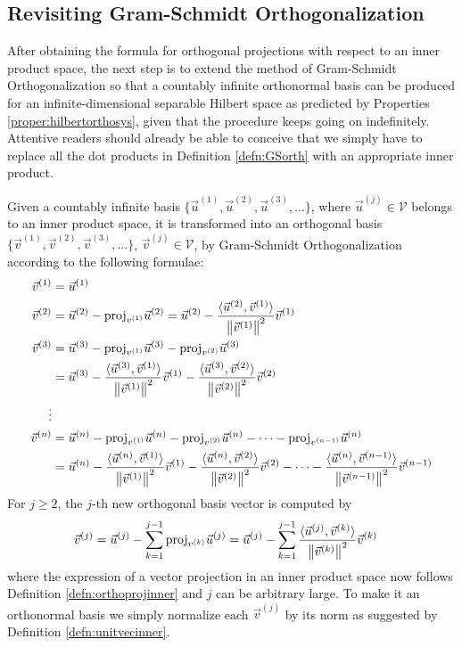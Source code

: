 \subsection{Revisiting Gram-Schmidt Orthogonalization}
\label{section:GSorthinnersec}

After obtaining the formula for orthogonal projections with respect to an inner product space, the next step is to extend the method of Gram-Schmidt Orthogonalization so that a countably infinite orthonormal basis can be produced for an infinite-dimensional separable Hilbert space as predicted by Properties \ref{proper:hilbertorthosys}, given that the procedure keeps going on indefinitely. Attentive readers should already be able to conceive that we simply have to replace all the dot products in Definition \ref{defn:GSorth} with an appropriate inner product. 
\begin{defn}
\label{defn:GSorthinner}
Given a countably infinite basis $\{\vec{u}^{(1)}, \vec{u}^{(2)}, \vec{u}^{(3)}, \ldots\}$, where $\vec{u}^{(j)} \in \mathcal{V}$ belongs to an inner product space, it is transformed into an orthogonal basis $\{\vec{v}^{(1)}, \vec{v}^{(2)}, \vec{v}^{(3)}, \ldots\}$, $\vec{v}^{(j)} \in \mathcal{V}$, by Gram-Schmidt Orthogonalization according to the following formulae:
\begin{align*}
\vec{v}^{(1)} &= \vec{u}^{(1)} \\
\vec{v}^{(2)} &= \vec{u}^{(2)} - \text{proj}_{v^{(1)}}\vec{u}^{(2)} = \vec{u}^{(2)} - \frac{\langle \vec{u}^{(2)}, \vec{v}^{(1)}\rangle}{\norm{\vec{v}^{(1)}}^2} \vec{v}^{(1)} \\
\vec{v}^{(3)} &= \vec{u}^{(3)} - \text{proj}_{v^{(1)}}\vec{u}^{(3)} - \text{proj}_{v^{(2)}}\vec{u}^{(3)} \\
&= \vec{u}^{(3)} - \frac{\langle\vec{u}^{(3)}, \vec{v}^{(1)}\rangle}{\norm{\vec{v}^{(1)}}^2} \vec{v}^{(1)} - \frac{\langle\vec{u}^{(3)}, \vec{v}^{(2)}\rangle}{\norm{\vec{v}^{(2)}}^2} \vec{v}^{(2)} \\
\vdots \\
\vec{v}^{(n)} &= \vec{u}^{(n)} - \text{proj}_{v^{(1)}}\vec{u}^{(n)} - \text{proj}_{v^{(2)}}\vec{u}^{(n)} - \cdots - \text{proj}_{v^{(n-1)}}\vec{u}^{(n)} \\
&= \vec{u}^{(n)} - \frac{\langle\vec{u}^{(n)}, \vec{v}^{(1)}\rangle}{\norm{\vec{v}^{(1)}}^2} \vec{v}^{(1)} - \frac{\langle\vec{u}^{(n)}, \vec{v}^{(2)}\rangle}{\norm{\vec{v}^{(2)}}^2} \vec{v}^{(2)} - \cdots - \frac{\langle\vec{u}^{(n)}, \vec{v}^{(n-1)}\rangle}{\norm{\vec{v}^{(n-1)}}^2} \vec{v}^{(n-1)}
\end{align*}
For $j \geq 2$, the $j$-th new orthogonal basis vector is computed by
\begin{align*}
\vec{v}^{(j)} &= \vec{u}^{(j)} - \sum_{k=1}^{j-1}\text{proj}_{v^{(k)}}\vec{u}^{(j)}  = \vec{u}^{(j)} - \sum_{k=1}^{j-1}\frac{\langle \vec{u}^{(j)}, \vec{v}^{(k)} \rangle}{\norm{\vec{v}^{(k)}}^2} \vec{v}^{(k)}
\end{align*}
where the expression of a vector projection in an inner product space now follows Definition \ref{defn:orthoprojinner} and $j$ can be arbitrary large. To make it an orthonormal basis we simply normalize each $\vec{v}^{(j)}$ by its norm as suggested by Definition \ref{defn:unitvecinner}.  
\end{defn}
